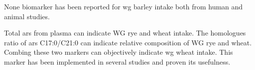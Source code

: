 None biomarker has been reported for \acrshort{wg} barley intake both from human and animal studies.

Total \acrshort{ars} from plasma can indicate WG rye and wheat intake.
The homologues ratio of \acrshort{ars} C17:0/C21:0 can indicate relative composition of WG rye and wheat. Combing these two markers can objectively indicate \acrshort{wg} wheat intake. This marker has been implemented in several studies and proven its usefulness.